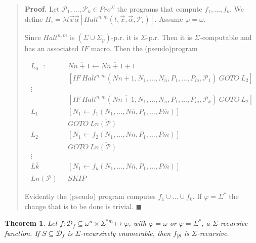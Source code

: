\documentclass[a4paper, 12pt]{article}
\newtheorem{theorem}{Theorem}
\newtheorem{theorem}{Theorem}
\begin{document}
\small
\begin{quote}

\textbf{Proof.} Let $\mathcal{P}_1, \ldots, \mathcal{P}_k \in Pro^{\Sigma}$ the
programs that compute $f_1, \ldots, f_k$. We define $H_i = \lambda t
\vec{x}\vec{\alpha} \left[ Halt^{n, m} \left( t, \vec{x}, \vec{\alpha},
\mathcal{P}_i \right)  \right]$. Assume $\varphi = \omega$. 

Since $Halt^{n, m}$ is $\left( \Sigma \cup \Sigma_p \right) $-p.r. it is
$\Sigma$-p.r. Then it is $\Sigma$-computable and has an associated $IF$ macro.
Then the (pseudo)program 

\begin{align*}
    L_0 ~ ~ ~ : &N{\overline{n + 1}} \leftarrow N{\overline{n+1}} + 1 \\ 
                &\left[ IF ~ Halt^{n, m} \left( N{\overline{n+1}}, N_1, \ldots,
                        N_{\overline{n}}, P_1, \ldots, P_{\overline{m}},
                \mathcal{P}_1 \right) ~ GOTO ~ L_2  \right] \\ 
                \vdots \\ 
                &\left[ IF ~ Halt^{n, m} \left( N{\overline{n+1}}, N_1, \ldots,
                        N_{\overline{n}}, P_1, \ldots, P_{\overline{m}},
                \mathcal{P}_k \right) ~ GOTO ~ L_2  \right] \\  
    L_1 ~ ~ ~ & \left[ N_1 \leftarrow f_1(N_1, \ldots,
                N\overline{n}, P_1, \ldots, P\overline{m}) \right] \\
              &GOTO ~ L{\overline{n(\mathcal{P})}}\\
    L_2 ~ ~ ~ & \left[ N_1 \leftarrow f_2(N_1, \ldots,
                N\overline{n}, P_1, \ldots, P\overline{m}) \right] \\
              &GOTO ~ L{\overline{n(\mathcal{P})}}\\
                \vdots \\ 
    L\overline{k} ~ ~ ~ &\left[ N_1 \leftarrow f_k(N_1, \ldots,
                N\overline{n}, P_1, \ldots, P\overline{m}) \right] \\ 
        L\overline{n(\mathcal{P})} ~ ~ ~ & SKIP
\end{align*}

Evidently the (pseudo) program computes $f_1 \cup \ldots \cup f_k$. If $\varphi
= \Sigma^{*}$ the change that is to be done is trivial. $\blacksquare$

\end{quote}
\normalsize

\begin{theorem}
    Let $f : \mathcal{D}_f \subseteq \omega^{n} \times \Sigma^{*m} \mapsto
    \varphi$, with $\varphi = \omega$ or $\varphi = \Sigma^{*}$, a
    $\Sigma$-recursive function. If $S
    \subseteq \mathcal{D}_f$ is $\Sigma$-recursively enumerable, then $f_{\mid
    S}$ is $\Sigma$-recursive.
\end{theorem}
\end{document}
